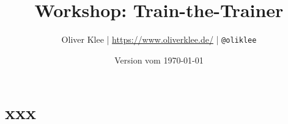 \documentclass[a4paper,openany,twoside,titlepage,10pt,headsepline]{scrbook}
\author{Oliver Klee | \url{https://www.oliverklee.de/} | \texttt{@oliklee}}
\title{Workshop: Train-the-Trainer}
\date{Version vom \today}
\begin{document}
\frontmatter

\maketitle

\tableofcontents

\mainmatter

\chapter{xxx}






\backmatter
\end{document}
